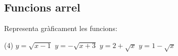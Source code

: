 \subsection{Funcions arrel}

\begin{mylist}
 \exer Representa gràficament les funcions:
 \begin{tasks}(4)
 	\task $y=\sqrt{x-1}$
 	\task $y=-\sqrt{x+3}$
 	\task $y=2+\sqrt{x}$
 	\task $y=1-\sqrt{x}$
\end{tasks}

\end{mylist}

